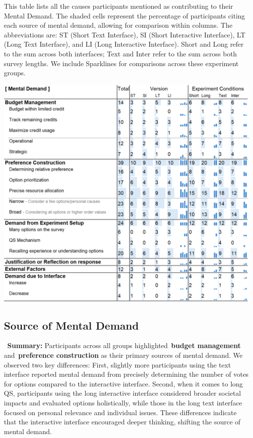 \begin{table}[h]
    \caption{This table lists all the causes participants mentioned as contributing to their Mental Demand. The shaded cells represent the percentage of participants citing each source of mental demand, allowing for comparison within columns. The abbreviations are: ST (Short Text Interface), SI (Short Interactive Interface), LT (Long Text Interface), and LI (Long Interactive Interface). Short and Long refer to the sum across both interfaces; Text and Inter refer to the sum across both survey lengths. We include Sparklines for comparisons across these experiment groups.}
    \label{tbl:mental}
    \includegraphics[width=\linewidth]{content/image/cog/mental_table.png}
\end{table}
\subsection{Source of Mental Demand}
\label{sec:mental}

\vspace{5pt}
\begin{tldrbox}
    \faInfoCircle~\xspace\textbf{Summary:} Participants across all groups highlighted~\textbf{budget management} and~\textbf{preference construction} as their primary sources of mental demand. We observed two key differences: First, slightly more participants using the text interface reported mental demand from precisely determining the number of votes for options compared to the interactive interface. Second, when it comes to long QS, participants using the long interactive interface considered broader societal impacts and evaluated options holistically, while those in the long text interface focused on personal relevance and individual issues. These differences indicate that the interactive interface encouraged deeper thinking, shifting the source of mental demand. %
\end{tldrbox}

